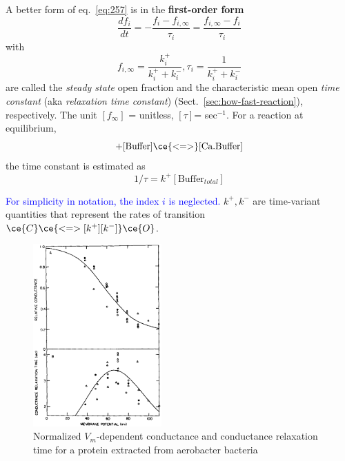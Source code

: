 A better form of eq.~\eqref{eq:257} is in the {\bf first-order form}
\begin{equation}
  \label{eq:36}
  \frac{df_i}{dt} = -\frac{f_i-f_{i,\infty}}{\tau_i} =
  \frac{f_{i,\infty} -f _i}{\tau_i}
\end{equation}
with
\begin{equation}
  \label{eq:37}
  f_{i,\infty} = \frac{k_i^+}{k_i^++k_i^-}, \tau_i = \frac{1}{k_i^++k_i^-}
\end{equation}
are called the {\it steady state} open fraction and the characteristic
mean open {\it time constant} (aka {\it relaxation time constant})
(Sect.~\ref{sec:how-fast-reaction}), respectively. The unit
$[f_\infty]$ = unitless, $[\tau]$= sec$^{-1}$. For a reaction at equilibrium,
\begin{equation}
[\Ca] + [\text{Buffer}] \ce{<=>} [\text{Ca.Buffer}]
\end{equation}
the time constant is estimated as
\begin{equation}
1/\tau = k^+ [\text{Buffer}_{total}]
\end{equation}


\textcolor{blue}{For simplicity in notation, the index $i$ is
  neglected.}
$k^+, k^-$ are time-variant quantities that represent
the rates of transition $\ce{C}\ce{<=>[k^+][k^-]}\ce{O}$.

\begin{figure}[hbt]
  \centerline{\includegraphics[height=7cm,
    angle=0]{./images/Lecar_g_V.eps}}
  \caption{Normalized $V_m$-dependent conductance and conductance
    relaxation time for a protein extracted from aerobacter bacteria}
  \label{fig:Lecar_V_g}
\end{figure}

